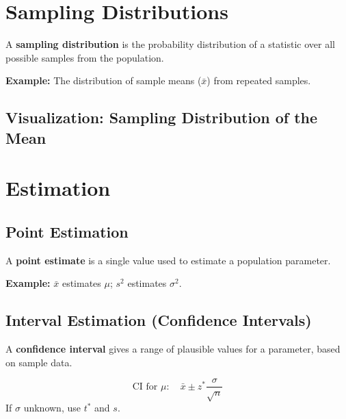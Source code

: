 \documentclass[11pt]{article}
\begin{document}
\section{Sampling Distributions}

A \textbf{sampling distribution} is the probability distribution of a statistic over all possible samples from the population.

\textbf{Example:} The distribution of sample means ($\bar{x}$) from repeated samples.

\subsection*{Visualization: Sampling Distribution of the Mean}
\begin{center}
\end{center}

\section{Estimation}

\subsection{Point Estimation}

A \textbf{point estimate} is a single value used to estimate a population parameter.

\textbf{Example:} $\bar{x}$ estimates $\mu$; $s^2$ estimates $\sigma^2$.

\subsection{Interval Estimation (Confidence Intervals)}

A \textbf{confidence interval} gives a range of plausible values for a parameter, based on sample data.

\[
\text{CI for } \mu: \quad \bar{x} \pm z^* \frac{\sigma}{\sqrt{n}}
\]
If $\sigma$ unknown, use $t^*$ and $s$.
\end{document}
